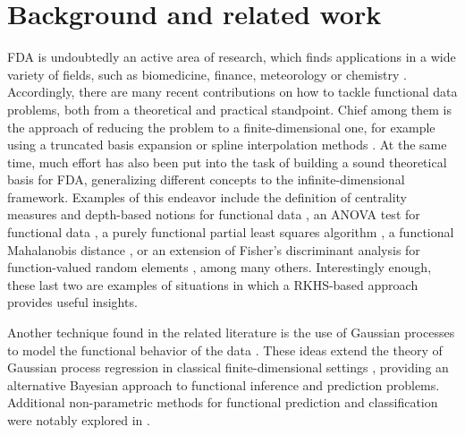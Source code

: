 %
%

\let\epsilon\varepsilon

\chapter{Background and related work}\label{ch:background}

FDA is undoubtedly an active area of research, which finds applications in a wide variety of fields, such as biomedicine, finance, meteorology or chemistry \citep[see for example][]{ullah2013applications}. Accordingly, there are many recent contributions on how to tackle functional data problems, both from a theoretical and practical standpoint. Chief among them is the approach of reducing the problem to a finite-dimensional one, for example using a truncated basis expansion or spline interpolation methods \citep[e.g.][]{muller2005generalized, aguilera2013comparative}. At the same time, much effort has also been put into the task of building a sound theoretical basis for FDA, generalizing different concepts to the infinite-dimensional framework. Examples of this endeavor include the definition of centrality measures and depth-based notions for functional data \citep[e.g.][]{fraiman2001trimmed, cuevas2007robust, lopez2009concept}, an ANOVA test for functional data \citep{cuevas2004anova}, a purely functional partial least squares algorithm \citep{delaigle2012methodology}, a functional Mahalanobis distance \citep[e.g.][]{berrendero2020mahalanobis, galeano2015mahalanobis}, or an extension of Fisher's discriminant analysis for function-valued random elements \citep[e.g.][]{james2001functional, shin2008extension}, among many others. Interestingly enough, these last two are examples of situations in which a RKHS-based approach provides useful insights.

Another technique found in the related literature is the use of Gaussian processes to model the functional behavior of the data \citep[see for instance][]{shi2011gaussian}. These ideas extend the theory of Gaussian process regression in classical finite-dimensional settings \citep[e.g.][]{rasmussen2004gaussian}, providing an alternative Bayesian approach to functional inference and prediction problems. Additional non-parametric methods for functional prediction and classification were notably explored in \citet{ferraty2006nonparametric}.

